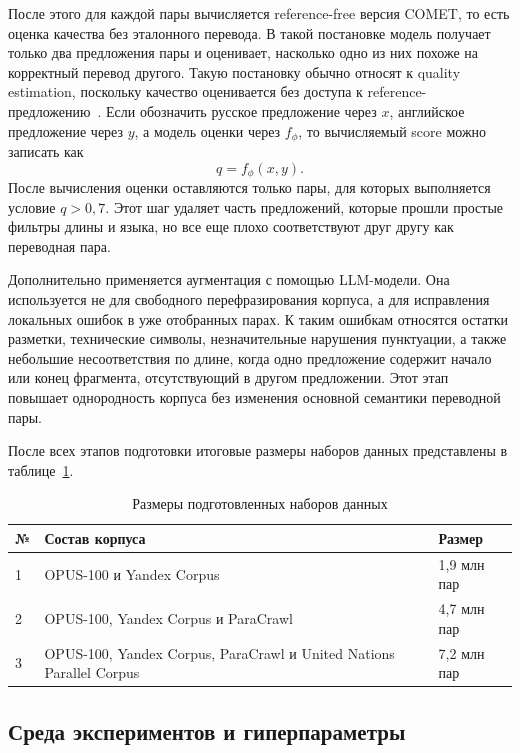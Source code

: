 После этого для каждой пары вычисляется reference-free версия COMET, то есть оценка качества без эталонного перевода.
В такой постановке модель получает только два предложения пары и оценивает, насколько одно из них похоже на корректный перевод другого.
Такую постановку обычно относят к quality estimation, поскольку качество оценивается без доступа к reference-предложению~\cite{cometkiwi}.
Если обозначить русское предложение через $x$, английское предложение через $y$, а модель оценки через $f_{\phi}$, то вычисляемый score можно записать как
\[
	q = f_{\phi}(x, y).
\]
После вычисления оценки оставляются только пары, для которых выполняется условие $q > 0{,}7$.
Этот шаг удаляет часть предложений, которые прошли простые фильтры длины и языка, но все еще плохо соответствуют друг другу как переводная пара.

Дополнительно применяется аугментация с помощью LLM-модели.
Она используется не для свободного перефразирования корпуса, а для исправления локальных ошибок в уже отобранных парах.
К таким ошибкам относятся остатки разметки, технические символы, незначительные нарушения пунктуации, а также небольшие несоответствия по длине, когда одно предложение содержит начало или конец фрагмента, отсутствующий в другом предложении.
Этот этап повышает однородность корпуса без изменения основной семантики переводной пары.

После всех этапов подготовки итоговые размеры наборов данных представлены в таблице~\ref{tab:dataset-sizes}.

\begin{table}[H]
	\centering
	\caption{Размеры подготовленных наборов данных}
	\label{tab:dataset-sizes}
	\begin{tabular}{|p{}|p{}|p{}|}
		\hline
		\textbf{№} & \textbf{Состав корпуса}                                             & \textbf{Размер} \\
		\hline
		1          & OPUS-100 и Yandex Corpus                                            & 1{,}9 млн пар   \\
		\hline
		2          & OPUS-100, Yandex Corpus и ParaCrawl                                 & 4{,}7 млн пар   \\
		\hline
		3          & OPUS-100, Yandex Corpus, ParaCrawl и United Nations Parallel Corpus & 7{,}2 млн пар   \\
		\hline
	\end{tabular}
\end{table}

\subsection{Среда экспериментов и гиперпараметры}

